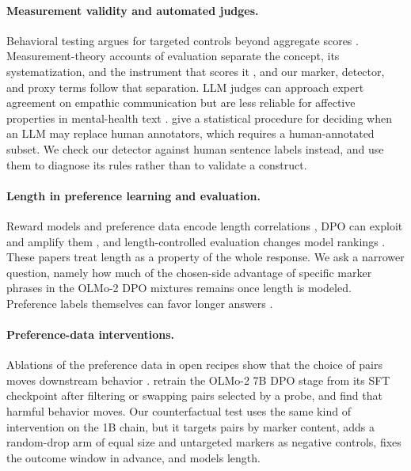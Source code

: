 \documentclass[11pt]{article}
\begin{document}
\paragraph{Measurement validity and automated judges.}
Behavioral testing argues for targeted controls beyond aggregate scores
\citep{ribeiro2020checklist}. Measurement-theory accounts of evaluation
separate the concept, its systematization, and the instrument that scores it
\citep{wallach2025position,bean2025construct}, and our marker, detector, and proxy
terms follow that separation. LLM judges can approach expert agreement on empathic communication
\citep{kumar2026reliable} but are less reliable for affective properties in
mental-health text \citep{badawi2026trust,welivita2026empathetic}.
\citet{calderon2025alttest} give a statistical
procedure for deciding when an LLM may replace human annotators, which
requires a human-annotated subset. We check our detector against human
sentence labels instead, and use them to diagnose its rules rather than to
validate a construct.

\paragraph{Length in preference learning and evaluation.}
Reward models and preference data encode length correlations
\citep{singhal2023long,shen2023loose}, DPO \citep{rafailov2023dpo} can exploit and amplify them
\citep{park2024disentangling,liu2024lddpo}, and length-controlled evaluation
changes model rankings \citep{dubois2024length}. These papers treat length as
a property of the whole response. We ask a narrower question, namely how much of the
chosen-side advantage of specific marker phrases in the OLMo-2 DPO mixtures
remains once length is modeled.
Preference labels themselves can favor longer answers \citep{saito2023verbosity}.

\paragraph{Preference-data interventions.}
Ablations of the preference data in open recipes show that the choice of
pairs moves downstream behavior \citep{ivison2024unpacking}.
\citet{xiao2026probe} retrain the OLMo-2 7B DPO stage from its SFT checkpoint
after filtering or swapping pairs selected by a probe, and find that harmful
behavior moves. Our counterfactual test uses the same kind of intervention on
the 1B chain, but it targets pairs by marker content, adds a random-drop arm
of equal size and untargeted markers as negative controls, fixes the outcome
window in advance, and models length.
\end{document}
